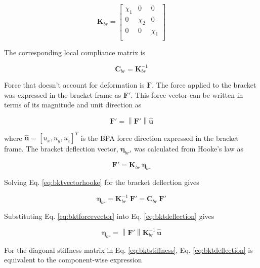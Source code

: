 \begin{equation}
\mathbf{K}_{br} = 
\begin{bmatrix}
\chi_{1} & 0   & 0 \\
0   & \chi_{2} & 0 \\
0   & 0   & \chi_{1} \\
\end{bmatrix}
\label{eq:bktstiffness}
\end{equation}

The corresponding local compliance matrix is 

\begin{equation}
\mathbf{C}_{br} = \mathbf{K}_{br}^{-1}
\label{eq:bktcompliance}
\end{equation}

Force that doesn't account for deformation is $\mathbf{F}$. The force applied to the bracket was expressed in the bracket frame as $\mathbf{F}'$. This force vector can be written in terms of its magnitude and unit direction as

\begin{equation}
\mathbf{F}' = \left\| \mathbf{F}' \right\| \hat{\mathbf{u}}
\label{eq:bktforcevector}
\end{equation}

where $\hat{\mathbf{u}} = [u_{x}, u_{y}, u_{z}]^{T}$ is the BPA force direction expressed in the bracket frame. The bracket deflection vector, $\boldsymbol{\eta}_{br}$, was calculated from Hooke's law as

\begin{equation} \mathbf{F}' = \mathbf{K}_{br} \: \boldsymbol{\eta}_{br}
\label{eq:bktvectorhooke}
\end{equation}

Solving Eq. \ref{eq:bktvectorhooke} for the bracket deflection gives

\begin{equation}
\boldsymbol{\eta}_{br} = \mathbf{K}_{br}^{-1} \: \mathbf{F}' = \mathbf{C}_{br} \: \mathbf{F}'
\label{eq:bktdeflection}
\end{equation}

Substituting Eq. \ref{eq:bktforcevector} into Eq. \ref{eq:bktdeflection} gives

\begin{equation}
\boldsymbol{\eta}_{br} = \left\| \mathbf{F}' \right\| \mathbf{K}_{br}^{-1} \,\hat{\mathbf{u}}
\label{eq:bktdeflectionforceunit}
\end{equation}

For the diagonal stiffness matrix in Eq. \ref{eq:bktstiffness}, Eq. \ref{eq:bktdeflection} is equivalent to the component-wise expression

